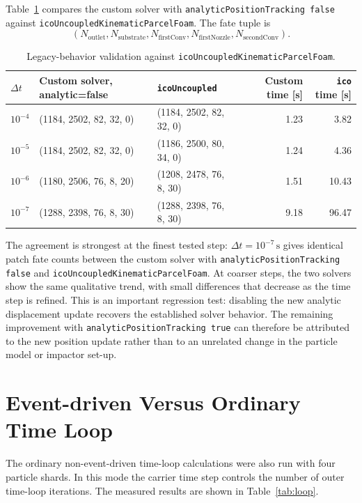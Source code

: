 \documentclass[11pt]{article}
\begin{document}
Table~\ref{tab:ico-compare} compares the custom solver with
\texttt{analyticPositionTracking false} against
\texttt{icoUncoupledKinematicParcelFoam}.  The fate tuple is
\[
    (N_\mathrm{outlet}, N_\mathrm{substrate}, N_\mathrm{firstConv},
     N_\mathrm{firstNozzle}, N_\mathrm{secondConv}).
\]

\begin{table}[h]
\centering
\caption{Legacy-behavior validation against \texttt{icoUncoupledKinematicParcelFoam}.}
\label{tab:ico-compare}
\begin{tabular}{@{}lllrr@{}}
\toprule
\(\Delta t\) & Custom solver, analytic=false & \texttt{icoUncoupled} & Custom time [s] & \texttt{ico} time [s] \\
\midrule
\(10^{-4}\) & (1184, 2502, 82, 32, 0) & (1184, 2502, 82, 32, 0) & 1.23 & 3.82  \\
\(10^{-5}\) & (1184, 2502, 82, 32, 0) & (1186, 2500, 80, 34, 0) & 1.24 & 4.36  \\
\(10^{-6}\) & (1180, 2506, 76, 8, 20) & (1208, 2478, 76, 8, 30) & 1.51 & 10.43 \\
\(10^{-7}\) & (1288, 2398, 76, 8, 30) & (1288, 2398, 76, 8, 30) & 9.18 & 96.47 \\
\bottomrule
\end{tabular}
\end{table}

The agreement is strongest at the finest tested step:
\(\Delta t=10^{-7}\,\mathrm{s}\) gives identical patch fate counts between the
custom solver with \texttt{analyticPositionTracking false} and
\texttt{icoUncoupledKinematicParcelFoam}.  At coarser steps, the two solvers
show the same qualitative trend, with small differences that decrease as the
time step is refined.  This is an important regression test: disabling the new
analytic displacement update recovers the established solver behavior.  The
remaining improvement with \texttt{analyticPositionTracking true} can therefore
be attributed to the new position update rather than to an unrelated change in
the particle model or impactor set-up.

\section{Event-driven Versus Ordinary Time Loop}

The ordinary non-event-driven time-loop calculations were also run with four
particle shards.  In this mode the carrier time step controls the number of
outer time-loop iterations.  The measured results are shown in
Table~\ref{tab:loop}.
\end{document}
